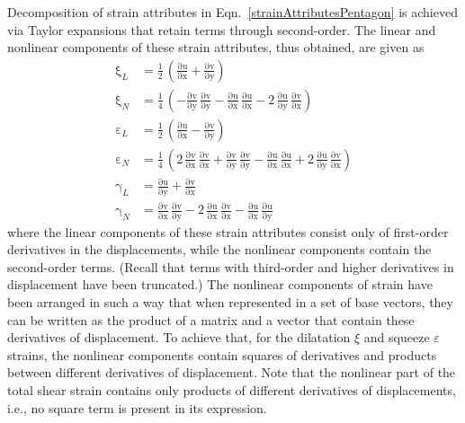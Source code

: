 Decomposition of strain attributes in Eqn.~\eqref{strainAttributesPentagon} is achieved via Taylor expansions that retain terms through second-order.  The linear and nonlinear components of these strain attributes, thus obtained, are given as
\begin{subequations}
	\begin{align}
		\mathrm \xi_{L} & = \frac{1}{2} \, \left(\mathrm{\frac{\partial u}{\partial x}} + \mathrm{\frac{\partial v}{\partial y}}\right)\\
		\mathrm \xi_{N} & = \frac{1}{4} \, \left(- \mathrm{\frac{ \partial v}{\partial y}}\, \mathrm{\frac{ \partial v}{\partial y}} -\mathrm{\frac{\partial u}{\partial x}}\, \mathrm{\frac{\partial u}{\partial x}} - 2 \, \mathrm{\frac{\partial u}{\partial y}}\, \mathrm{\frac{\partial v}{\partial x}}\right)\\
		\mathrm \varepsilon_{L} & = \frac{1}{2} \, \left(\mathrm{\frac{\partial u}{\partial x}} - \mathrm{\frac{\partial v}{\partial y}}\right)\\
		\mathrm \varepsilon_{N} & = \frac{1}{4} \, \left(2 \, \mathrm{\frac{ \partial v}{\partial x}}\, \mathrm{\frac{ \partial v}{\partial x}} + \mathrm{\frac{ \partial v}{\partial y}}\, \mathrm{\frac{ \partial v}{\partial y}} -\mathrm{\frac{\partial u}{\partial x}}\, \mathrm{\frac{\partial u}{\partial x}} + 2 \, \mathrm{\frac{\partial u}{\partial y}}\, \mathrm{\frac{\partial v}{\partial x}}\right)\\
		\mathrm \gamma_{L} & = \mathrm{\frac{\partial u}{\partial y}} + \mathrm{\frac{\partial v}{\partial x}}\\
		\mathrm \gamma_{N} & = \mathrm{\frac{\partial v}{\partial x}}\, \mathrm{\frac{\partial v}{\partial y}} - 2\, \mathrm{\frac{ \partial u}{\partial x}}\, \mathrm{\frac{ \partial v}{\partial x}} 
		-\mathrm{\frac{\partial u}{\partial x}}\, \mathrm{\frac{\partial u}{\partial y}} 
	\end{align}
\end{subequations}
where the linear components of these strain attributes consist only of first-order derivatives in the displacements, while the nonlinear components contain the second-order terms. (Recall that terms with third-order and higher derivatives in displacement have been truncated.) The nonlinear components of strain have been arranged in such a way that when represented in a set of base vectors, they can be written as the product of a matrix and a vector that contain these derivatives of displacement.  To achieve that, for the dilatation $\xi$ and squeeze $\varepsilon$ strains, the nonlinear components contain squares of derivatives and products between different derivatives of displacement. Note that the nonlinear part of the total shear strain contains only products of different derivatives of displacements, i.e., no square term is present in its expression. 

